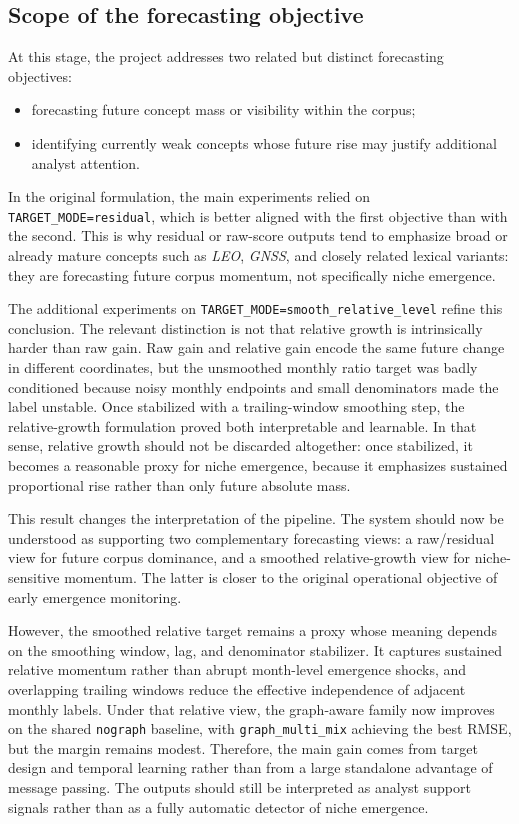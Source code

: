 \documentclass[pdflatex,sn-basic]{sn-jnl}
\begin{document}
\subsection{Scope of the forecasting objective}
At this stage, the project addresses two related but distinct forecasting objectives:
\begin{itemize}
  \item forecasting future concept mass or visibility within the corpus;
  \item identifying currently weak concepts whose future rise may justify additional analyst attention.
\end{itemize}

In the original formulation, the main experiments relied on \texttt{TARGET\_MODE=residual}, which is better aligned with the first objective than with the second. This is why residual or raw-score outputs tend to emphasize broad or already mature concepts such as \textit{LEO}, \textit{GNSS}, and closely related lexical variants: they are forecasting future corpus momentum, not specifically niche emergence.

The additional experiments on \texttt{TARGET\_MODE=smooth\_relative\_level} refine this conclusion. The relevant distinction is not that relative growth is intrinsically harder than raw gain. Raw gain and relative gain encode the same future change in different coordinates, but the unsmoothed monthly ratio target was badly conditioned because noisy monthly endpoints and small denominators made the label unstable. Once stabilized with a trailing-window smoothing step, the relative-growth formulation proved both interpretable and learnable. In that sense, relative growth should not be discarded altogether: once stabilized, it becomes a reasonable proxy for niche emergence, because it emphasizes sustained proportional rise rather than only future absolute mass.

This result changes the interpretation of the pipeline. The system should now be understood as supporting two complementary forecasting views: a raw/residual view for future corpus dominance, and a smoothed relative-growth view for niche-sensitive momentum. The latter is closer to the original operational objective of early emergence monitoring.

However, the smoothed relative target remains a proxy whose meaning depends on the smoothing window, lag, and denominator stabilizer. It captures sustained relative momentum rather than abrupt month-level emergence shocks, and overlapping trailing windows reduce the effective independence of adjacent monthly labels. Under that relative view, the graph-aware family now improves on the shared \texttt{nograph} baseline, with \texttt{graph\_multi\_mix} achieving the best RMSE, but the margin remains modest. Therefore, the main gain comes from target design and temporal learning rather than from a large standalone advantage of message passing. The outputs should still be interpreted as analyst support signals rather than as a fully automatic detector of niche emergence.
\end{document}
